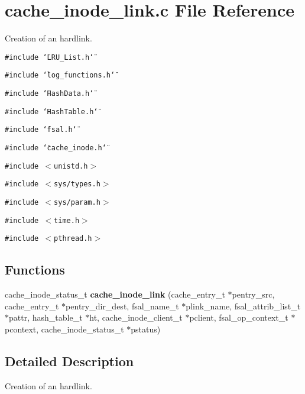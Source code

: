 \section{cache\_\-inode\_\-link.c File Reference}
\label{cache__inode__link_8c}
Creation of an hardlink. 

{\tt \#include \char`\"{}LRU\_\-List.h\char`\"{}}\par
{\tt \#include \char`\"{}log\_\-functions.h\char`\"{}}\par
{\tt \#include \char`\"{}Hash\-Data.h\char`\"{}}\par
{\tt \#include \char`\"{}Hash\-Table.h\char`\"{}}\par
{\tt \#include \char`\"{}fsal.h\char`\"{}}\par
{\tt \#include \char`\"{}cache\_\-inode.h\char`\"{}}\par
{\tt \#include $<$unistd.h$>$}\par
{\tt \#include $<$sys/types.h$>$}\par
{\tt \#include $<$sys/param.h$>$}\par
{\tt \#include $<$time.h$>$}\par
{\tt \#include $<$pthread.h$>$}\par
\subsection*{Functions}
\begin{CompactItemize}
\item 
cache\_\-inode\_\-status\_\-t {\bf cache\_\-inode\_\-link} (cache\_\-entry\_\-t $\ast$pentry\_\-src, cache\_\-entry\_\-t $\ast$pentry\_\-dir\_\-dest, fsal\_\-name\_\-t $\ast$plink\_\-name, fsal\_\-attrib\_\-list\_\-t $\ast$pattr, hash\_\-table\_\-t $\ast$ht, cache\_\-inode\_\-client\_\-t $\ast$pclient, fsal\_\-op\_\-context\_\-t $\ast$pcontext, cache\_\-inode\_\-status\_\-t $\ast$pstatus)
\end{CompactItemize}


\subsection{Detailed Description}
Creation of an hardlink. 

